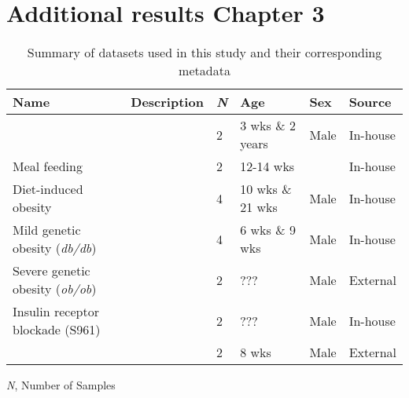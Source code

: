 \clearpage


\section{Additional results Chapter 3}

\begin{table}[h]
\renewcommand{\arraystretch}{2}
  \centering
  \caption{Summary of datasets used in this study and their corresponding metadata}
  \label{tab3-1}

  \begin{tabularx}{\textwidth}{W{2.5cm} X W{1cm} W{1.7cm} W{1.5cm} W{1.3cm}}
    \toprule
    \textbf{Name} & \textbf{Description} & \textbf{\textit{N}} & \textbf{Age} & \textbf{Sex} & \textbf{Source} \\
    \midrule
     &  & 2 & 3 wks \& 2 years & Male & In-house \\
    \hline
    Meal feeding &  & 2 & 12-14 wks &  & In-house \\
    \hline
    Diet-induced obesity &  & 4 & 10 wks \& 21 wks & Male & In-house \\
    \hline
    Mild genetic obesity (\textit{db/db}) &  & 4 & 6 wks \& 9 wks & Male & In-house \\
    \hline
    Severe genetic obesity (\textit{ob/ob}) &  & 2 & ??? & Male & External \textbf{\cite{chung_endocrine-exocrine_2020}} \\
    \hline
    Insulin receptor blockade (S961) &  & 2 & ??? & Male & In-house \\
    \hline
     &  & 2 & 8 wks & Male & External \textbf{\cite{sachs_targeted_2020}} \\
    \bottomrule
   
  \end{tabularx}
\end{table}
\textit{N}, Number of Samples

